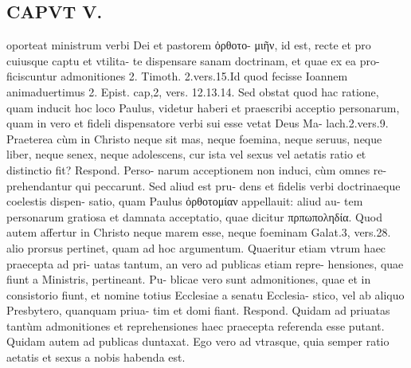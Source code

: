 \documentclass{article}
\begin{document}
\begin{pages}
\section*{CAPVT  V. }
\marginpar{[ p.249 ]}\pstart oporteat ministrum verbi Dei et pastorem ὀρθοτο- μιῆν, id est, recte et pro cuiusque captu et vtilita- te dispensare sanam doctrinam, et quae ex ea pro- ficiscuntur admonitiones 2. Timoth. 2.vers.15.Id quod fecisse Ioannem animaduertimus 2. Epist. cap,2, vers. 12.13.14. Sed obstat quod hac ratione, quam inducit hoc loco Paulus, videtur haberi et praescribi acceptio personarum, quam in vero et fideli dispensatore verbi sui esse vetat Deus Ma- lach.2.vers.9. Praeterea cùm in Christo neque sit mas, neque foemina, neque seruus, neque liber, neque senex, neque adolescens, cur ista vel sexus vel aetatis ratio et distinctio fit? Respond. Perso- narum acceptionem non induci, cùm omnes re- prehendantur qui peccarunt. Sed aliud est pru- dens et fidelis verbi doctrinaeque coelestis dispen- satio, quam Paulus ὀρθοτομίαν appellauit: aliud au- tem personarum gratiosa et damnata acceptatio, quae dicitur πρπωποληδία. Quod autem affertur in Christo neque marem esse, neque foeminam Galat.3, vers.28. alio prorsus pertinet, quam ad hoc argumentum.  \pend\pstart Quaeritur etiam vtrum haec praecepta ad pri- uatas tantum, an vero ad publicas etiam repre- hensiones, quae fiunt a Ministris, pertineant. Pu- blicae vero sunt admonitiones, quae et in consistorio fiunt, et nomine totius Ecclesiae a senatu Ecclesia- stico, vel ab aliquo Presbytero, quanquam priua- tim et domi fiant. Respond. Quidam ad priuatas tantùm admonitiones et reprehensiones haec praecepta referenda esse putant. Quidam autem ad publicas duntaxat. Ego vero ad vtrasque, quia semper ratio aetatis et sexus a nobis habenda est.  \pend

\end{pages}
\end{document}
